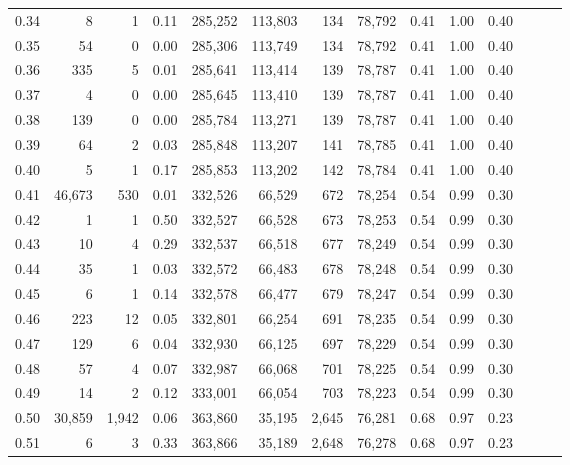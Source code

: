 \begin{tabular}{rrrrrrrrrrrrrr}
0.34 &       8 &       1 &  0.11 &  285,252 &  113,803 &     134 &  78,792 &  0.41 &  1.00 &      0.40 \\
0.35 &      54 &       0 &  0.00 &  285,306 &  113,749 &     134 &  78,792 &  0.41 &  1.00 &      0.40 \\
0.36 &     335 &       5 &  0.01 &  285,641 &  113,414 &     139 &  78,787 &  0.41 &  1.00 &      0.40 \\
0.37 &       4 &       0 &  0.00 &  285,645 &  113,410 &     139 &  78,787 &  0.41 &  1.00 &      0.40 \\
0.38 &     139 &       0 &  0.00 &  285,784 &  113,271 &     139 &  78,787 &  0.41 &  1.00 &      0.40 \\
0.39 &      64 &       2 &  0.03 &  285,848 &  113,207 &     141 &  78,785 &  0.41 &  1.00 &      0.40 \\
0.40 &       5 &       1 &  0.17 &  285,853 &  113,202 &     142 &  78,784 &  0.41 &  1.00 &      0.40 \\
0.41 &  46,673 &     530 &  0.01 &  332,526 &   66,529 &     672 &  78,254 &  0.54 &  0.99 &      0.30 \\
0.42 &       1 &       1 &  0.50 &  332,527 &   66,528 &     673 &  78,253 &  0.54 &  0.99 &      0.30 \\
0.43 &      10 &       4 &  0.29 &  332,537 &   66,518 &     677 &  78,249 &  0.54 &  0.99 &      0.30 \\
0.44 &      35 &       1 &  0.03 &  332,572 &   66,483 &     678 &  78,248 &  0.54 &  0.99 &      0.30 \\
0.45 &       6 &       1 &  0.14 &  332,578 &   66,477 &     679 &  78,247 &  0.54 &  0.99 &      0.30 \\
0.46 &     223 &      12 &  0.05 &  332,801 &   66,254 &     691 &  78,235 &  0.54 &  0.99 &      0.30 \\
0.47 &     129 &       6 &  0.04 &  332,930 &   66,125 &     697 &  78,229 &  0.54 &  0.99 &      0.30 \\
0.48 &      57 &       4 &  0.07 &  332,987 &   66,068 &     701 &  78,225 &  0.54 &  0.99 &      0.30 \\
0.49 &      14 &       2 &  0.12 &  333,001 &   66,054 &     703 &  78,223 &  0.54 &  0.99 &      0.30 \\
0.50 &  30,859 &   1,942 &  0.06 &  363,860 &   35,195 &   2,645 &  76,281 &  0.68 &  0.97 &      0.23 \\
0.51 &       6 &       3 &  0.33 &  363,866 &   35,189 &   2,648 &  76,278 &  0.68 &  0.97 &      0.23 \\

\end{tabular}
